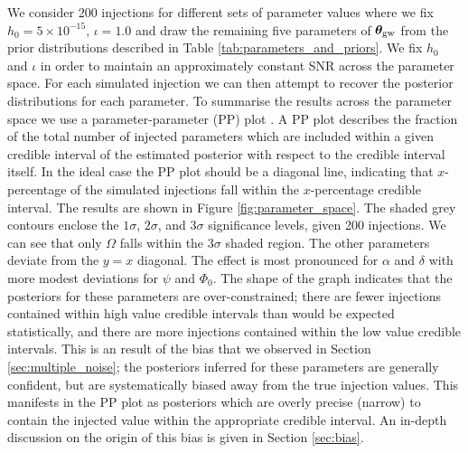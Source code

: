 \documentclass[fleqn,usenatbib,useAMS]{mnras}
\begin{document}
We consider 200 injections for different sets of parameter values where we fix $h_0 = 5 \times 10^{-15}$, $\iota =1.0$ and draw the remaining five parameters of $\boldsymbol{\theta}_{\rm gw}$ from the prior distributions described in Table \ref{tab:parameters_and_priors}. We fix $h_0$ and $\iota$ in order to maintain an approximately constant SNR across the parameter space. For each simulated injection we can then attempt to recover the posterior distributions for each parameter. To summarise the results across the parameter space we use a parameter-parameter (PP) plot \citep{doi:10.1198/106186006X136976}. A PP plot describes the fraction of the total number of injected parameters which are included within a given credible interval of the estimated posterior with respect to the credible interval itself. In the ideal case the PP plot should be a diagonal line, indicating that $x$-percentage of the simulated injections fall within the $x$-percentage credible interval. The results are shown in Figure \ref{fig:parameter_space}. The shaded grey contours enclose the $1\sigma$, $2\sigma$, and $3\sigma$ significance levels, given 200 injections. We can see that only $\Omega$ falls within the $3\sigma$ shaded region. The other parameters deviate from the $y=x$ diagonal. The effect is most pronounced for $\alpha$ and $\delta$ with more modest deviations for $\psi$ and $\Phi_0$. The shape of the graph indicates that the posteriors for these parameters are over-constrained; there are fewer injections contained within high value credible intervals than would be expected statistically, and there are more injections contained within the low value credible intervals. This is an result of the bias that we observed in Section \ref{sec:multiple_noise}; the posteriors inferred for these parameters are generally confident, but are systematically biased away from the true injection values. This manifests in the PP plot as posteriors which are overly precise (narrow) to contain the injected value within the appropriate credible interval. An in-depth discussion on the origin of this bias is given in Section \ref{sec:bias}. 
\end{document}
